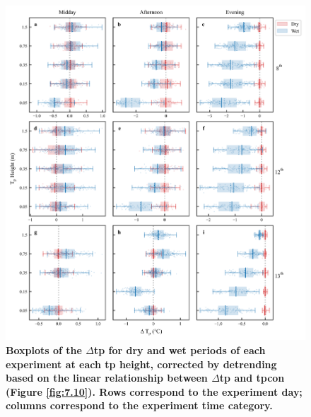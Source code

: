 \documentclass[final,3p,times,authoryear]{elsarticle}
\begin{document}
\begin{figure}
\centering
\includegraphics[trim={0 0 0 0},clip,scale=1.0]{temp_profile_box_plot_control_t.png}
\caption{\bf Boxplots of the $\Delta$\gls{tp} for dry and wet periods of each experiment at each \gls{tp} height, corrected by detrending based on the linear relationship between $\Delta$\gls{tp} and \gls{tpcon} (Figure \ref{fig:7.10}). Rows correspond to the experiment day; columns correspond to the experiment time category.}
 \label{fig:7.11}
\end{figure}


\end{document}
